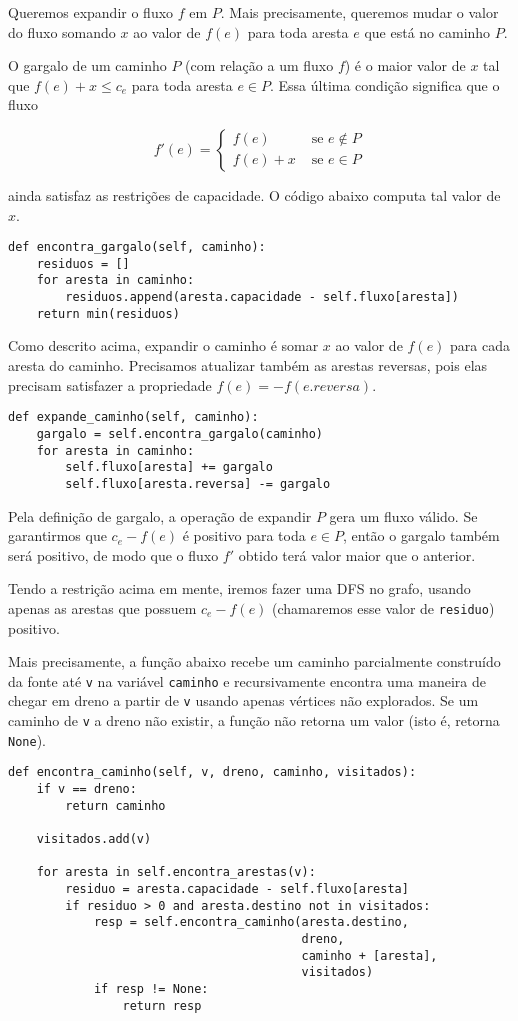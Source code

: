 \documentclass[11pt]{article}
\begin{document}
Queremos expandir o fluxo $f$ em $P$. Mais precisamente, queremos
mudar o valor do fluxo somando $x$ ao valor de $f(e)$ para toda aresta
$e$ que está no caminho $P$.

O gargalo de um caminho $P$ (com relação a um fluxo $f$) é o maior
valor de $x$ tal que $f(e) + x \leq c_e$ para toda aresta $e \in
P$. Essa última condição significa que o fluxo

\[ f'(e) = \begin{cases}f(e)&\text{ se } e \not\in P \\
                        f(e) + x&\text{ se } e \in P\end{cases} \]

ainda satisfaz as restrições de capacidade. O código abaixo computa
tal valor de $x$.
\begin{verbatim}
def encontra_gargalo(self, caminho):
    residuos = []
    for aresta in caminho:
        residuos.append(aresta.capacidade - self.fluxo[aresta])
    return min(residuos)
\end{verbatim}

Como descrito acima, expandir o caminho é somar $x$ ao valor de $f(e)$
para cada aresta do caminho. Precisamos atualizar também as arestas
reversas, pois elas precisam satisfazer a propriedade $f(e) =
-f(e.reversa)$.
\begin{verbatim}
def expande_caminho(self, caminho):
    gargalo = self.encontra_gargalo(caminho)
    for aresta in caminho:
        self.fluxo[aresta] += gargalo
        self.fluxo[aresta.reversa] -= gargalo
\end{verbatim}

Pela definição de gargalo, a operação de expandir $P$ gera um fluxo
válido. Se garantirmos que $c_e - f(e)$ é positivo para toda $e \in
P$, então o gargalo também será positivo, de modo que o fluxo $f'$
obtido terá valor maior que o anterior.

Tendo a restrição acima em mente, iremos fazer uma DFS no grafo,
usando apenas as arestas que possuem $c_e - f(e)$ (chamaremos esse
valor de \verb~residuo~) positivo.

Mais precisamente, a função abaixo recebe um caminho parcialmente
construído da fonte até \verb~v~ na variável \verb~caminho~ e recursivamente
encontra uma maneira de chegar em dreno a partir de \verb~v~ usando apenas
vértices não explorados. Se um caminho de \verb~v~ a dreno não existir, a
função não retorna um valor (isto é, retorna \verb~None~).

\begin{verbatim}
def encontra_caminho(self, v, dreno, caminho, visitados):
    if v == dreno:
        return caminho

    visitados.add(v)

    for aresta in self.encontra_arestas(v):
        residuo = aresta.capacidade - self.fluxo[aresta]
        if residuo > 0 and aresta.destino not in visitados:
            resp = self.encontra_caminho(aresta.destino,
                                         dreno,
                                         caminho + [aresta],
                                         visitados)
            if resp != None:
                return resp
\end{verbatim}
\end{document}
